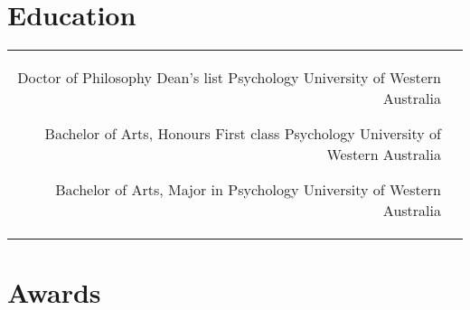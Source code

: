 \documentclass[10pt]{article} %
\begin{document}
\begin{paracol}{2}
\section{Education} 





\begin{supertabular}{rl} %

	{Doctor of Philosophy} %
	{Dean's list} %
	{Psychology} %
	{University of Western Australia} %


	{Bachelor of Arts, Honours} %
	{First class} %
	{Psychology} %
	{University of Western Australia} %
	
 	{Bachelor of Arts, Major in Psychology} %
 	{}
 	{}
 	{University of Western Australia} %
	

      \end{supertabular}



\section{Awards}


\end{paracol}
\end{document}
